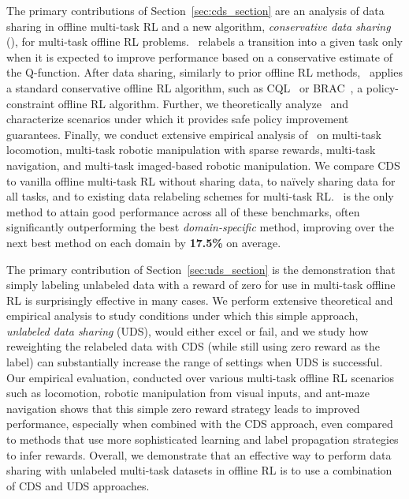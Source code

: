 \documentclass[../thesis.tex]{subfiles}
\begin{document}
The primary contributions of Section~\ref{sec:cds_section} are an analysis of data sharing in offline multi-task RL and a new algorithm, \textit{conservative data sharing} (\cdsmethodname), for multi-task offline RL problems. {\cdsmethodname\ relabels a transition into a given task only when it is expected to improve performance based on a conservative estimate of the Q-function.} 
After data sharing, similarly to prior offline RL methods, \cdsmethodname\ applies a standard conservative offline RL algorithm, such as CQL~\citep{kumar2020conservative} or BRAC~\citep{wu2019behavior}, a policy-constraint offline RL algorithm. Further, we theoretically analyze \cdsmethodname\ and characterize scenarios under which it provides safe policy improvement guarantees. Finally, we conduct extensive empirical analysis of \cdsmethodname\ on multi-task locomotion, multi-task robotic manipulation with sparse rewards, multi-task navigation, and multi-task imaged-based robotic manipulation. We compare CDS to vanilla offline multi-task RL without sharing data, to na\"{i}vely sharing data for all tasks, and to existing data relabeling schemes for multi-task RL. \cdsmethodname\ is the only method to attain good performance across all of these benchmarks, often significantly outperforming the best \textit{domain-specific} method, improving over the next best method on each domain by \textbf{17.5\%} on average.

The primary contribution of Section~\ref{sec:uds_section} is the demonstration that simply labeling unlabeled data with a reward of zero for use in multi-task offline RL is surprisingly effective in many cases. We perform extensive theoretical and empirical analysis to study conditions under which this simple approach, \emph{unlabeled data sharing} (UDS), would either excel or fail, and we study how reweighting the relabeled data with CDS (while still using zero reward as the label) can substantially increase the range of settings when UDS is successful. Our empirical evaluation, conducted over various multi-task offline RL scenarios such as locomotion, robotic manipulation from visual inputs, and ant-maze navigation shows that this simple zero reward strategy leads to improved performance, especially when combined with the CDS approach, even compared to methods that use more sophisticated learning and label propagation strategies to infer rewards. Overall, we demonstrate that an effective way to perform data sharing with unlabeled multi-task datasets in offline RL is to use a combination of CDS and UDS approaches.
\end{document}
